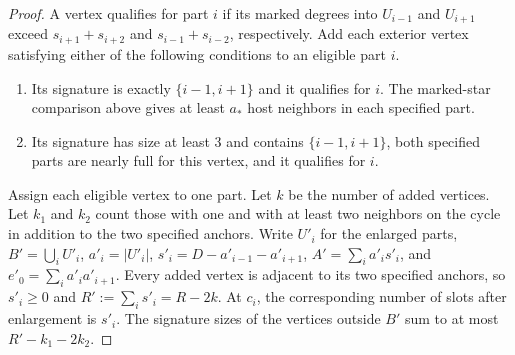 \documentclass[preprint,11pt,numbers]{elsarticle-arxiv}
\numberwithin{equation}{section}
\theoremstyle{definition}
\begin{document}
\begin{proof}
A vertex qualifies for part $i$ if its marked degrees into
$U_{i-1}$ and $U_{i+1}$ exceed $s_{i+1}+s_{i+2}$ and
$s_{i-1}+s_{i-2}$, respectively. Add each exterior vertex satisfying
either of the following conditions to an eligible part $i$.
\begin{enumerate}[label=(\roman*)]
\item Its signature is exactly $\{i-1,i+1\}$ and it qualifies for $i$.
      The marked-star comparison above gives at least $a_*$ host
      neighbors in each specified part.
\item Its signature has size at least $3$ and contains $\{i-1,i+1\}$,
      both specified parts are nearly full for this vertex,
      and it qualifies for $i$.
\end{enumerate}
Assign each eligible vertex to one part. Let $k$ be the number of
added vertices. Let $k_1$ and $k_2$ count those with one and with at least
two neighbors on the cycle in addition to the two specified anchors.
Write $U'_i$ for the enlarged parts, $B'=\bigcup_i U'_i$,
$a'_i=|U'_i|$, $s'_i=D-a'_{i-1}-a'_{i+1}$, $A'=\sum_i a'_is'_i$,
and $e'_0=\sum_i a'_ia'_{i+1}$. Every added vertex is adjacent to its two
specified anchors, so $s'_i\geq0$ and $R':=\sum_i s'_i=R-2k$.
At $c_i$, the corresponding number of slots after enlargement is $s'_i$.
The signature sizes of the vertices outside $B'$ sum to at most
$R'-k_1-2k_2$.


\end{proof}
\end{document}
